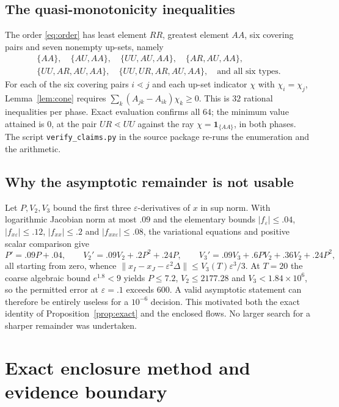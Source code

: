 \documentclass[11pt]{article}
\theoremstyle{remark}
\newcommand{\one}{\mathbf 1}
\newcommand{\eps}{\varepsilon}
\begin{document}
\subsection{The quasi-monotonicity inequalities}
The order \eqref{eq:order} has least element $RR$, greatest element $AA$, six
covering pairs and seven nonempty up-sets, namely
\begin{gather*}
\{AA\},\quad \{AU,AA\},\quad \{UU,AU,AA\},\quad \{AR,AU,AA\},\\
\{UU,AR,AU,AA\},\quad \{UU,UR,AR,AU,AA\},\quad \text{and all six types}.
\end{gather*}
For each of the six covering pairs $i\lessdot j$ and each up-set indicator $\chi$
with $\chi_i=\chi_j$, Lemma~\ref{lem:cone} requires
$\sum_k(A_{jk}-A_{ik})\chi_k\ge0$. This is $32$ rational inequalities per phase.
Exact evaluation confirms all $64$; the minimum value attained is $0$, at the
pair $UR\lessdot UU$ against the ray $\chi=\one_{\{AA\}}$, in both phases. The
script \texttt{verify\_claims.py} in the source package re-runs the enumeration
and the arithmetic.

\subsection{Why the asymptotic remainder is not usable}
Let $P,V_2,V_3$ bound the first three $\eps$-derivatives of $x$ in sup norm. With
logarithmic Jacobian norm at most $.09$ and the elementary bounds
$|f_\eps|\le.04$, $|f_{x\eps}|\le.12$, $|f_{xx}|\le.2$ and $|f_{xx\eps}|\le.08$,
the variational equations and positive scalar comparison give
\[
 P'=.09P+.04,\qquad V_2'=.09V_2+.2P^2+.24P,\qquad
 V_3'=.09V_3+.6PV_2+.36V_2+.24P^2,
\]
all starting from zero, whence
$\|x_I-x_J-\eps^2\Delta\|\le V_3(T)\eps^3/3$. At $T=20$ the coarse algebraic
bound $e^{1.8}<9$ yields $P\le7.2$, $V_2\le2177.28$ and $V_3<1.84\times10^6$, so
the permitted error at $\eps=.1$ exceeds $600$. A valid asymptotic statement can
therefore be entirely useless for a $10^{-6}$ decision. This motivated both the
exact identity of Proposition~\ref{prop:exact} and the enclosed flows.
No larger search for a sharper remainder was undertaken.

\section{Exact enclosure method and evidence boundary}\label{sec:certificate}
\end{document}
